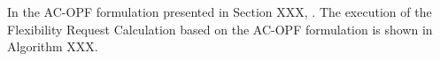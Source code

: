 In the AC-OPF formulation presented in Section XXX, . The execution of the Flexibility Request Calculation based on the AC-OPF formulation is shown in Algorithm XXX. 




